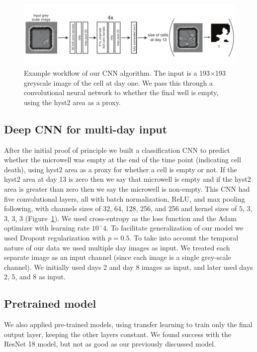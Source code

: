 \documentclass[10pt,twocolumn,letterpaper]{article}
\begin{document}
 \begin{figure}[t!]
\begin{center}
\includegraphics[width=0.8\linewidth]{figures/networkExampleImage_v2.pdf}
\end{center}
   \caption{Example workflow of our CNN algorithm.  The input is a 193$\times$193 greyscale image of the cell at day one.  We pass this through a convolutional neural network to whether the final well is empty, using the hyst2 area as a proxy.}
\label{workflow}
\end{figure}

\subsection{Deep CNN for multi-day input}
\label{multidayCNN}

After the initial proof of principle we built a classification CNN to predict whether the microwell was empty at the end of the time point (indicating cell death), using hyst2 area as a proxy for whether a cell is empty or not.  If the hyst2 area at day 13 is zero then we say that microwell is empty and if the hyst2 area is greater than zero then we say the microwell is non-empty.  This CNN had five convolutional layers, all with batch normalization, ReLU, and max pooling following, with channels sizes of 32, 64, 128, 256, and 256 and kernel sizes of 5, 3, 3, 3, 3 (Figure~\ref{workflow}).  We used cross-entropy as the loss function and the Adam optimizer with learning rate $10^-4$.   To facilitate generalization of our model we used Dropout regularization with $p = 0.5$.  To take into account the temporal nature of our data we used multiple day images as input.  We treated each separate image as an input channel (since each image is a single grey-scale channel).  We initially used days 2 and day 8 images as input, and later used days 2, 5, and 8 as input.


\subsection{Pretrained model}

We also applied pre-trained models, using transfer learning to train only the final output layer, keeping the other layers constant.  We found success with the ResNet 18 model, but not as good as our previously discussed model.
\end{document}
